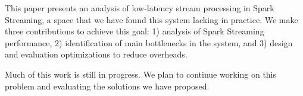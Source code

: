 This paper presents an analysis of low-latency stream processing in Spark Streaming, a space that we have found this system lacking in practice.
We make three contributions to achieve this goal: 1) analysis of Spark Streaming performance, 2) identification of main bottlenecks in the system, and 3) design and evaluation optimizations to reduce overheads.

Much of this work is still in progress. We plan to continue working on this problem and evaluating the solutions we have proposed. 
